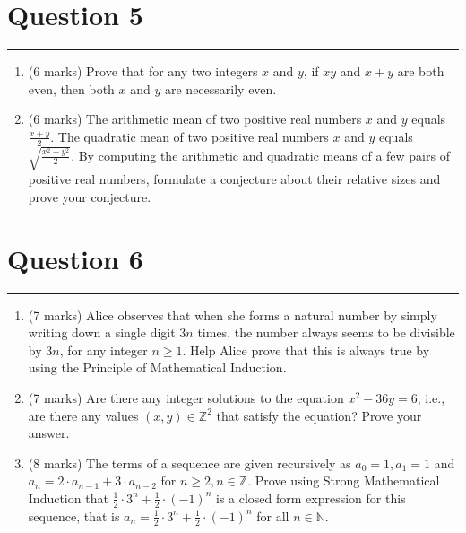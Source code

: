 \documentclass{article}
\begin{document}
\section*{Question 5}
\hrule
\vspace{0.5cm}

\begin{enumerate}[label=\alph*.]
    \item (6 marks) Prove that for any two integers \( x \) and \( y \), if \( xy \) and \( x + y \) are both even, then both \( x \) and \( y \) are necessarily even.
    \item (6 marks) The arithmetic mean of two positive real numbers \( x \) and \( y \) equals \( \frac{x + y}{2} \). The quadratic mean of two positive real numbers \( x \) and \( y \) equals \( \sqrt{\frac{x^2 + y^2}{2}} \). By computing the arithmetic and quadratic means of a few pairs of positive real numbers, formulate a conjecture about their relative sizes and prove your conjecture.
\end{enumerate}

\section*{Question 6}
\hrule
\vspace{0.5cm}

\begin{enumerate}[label=\alph*.]
    \item (7 marks) Alice observes that when she forms a natural number by simply writing down a single digit \( 3n \) times, the number always seems to be divisible by \( 3n \), for any integer \( n \geq 1 \). Help Alice prove that this is always true by using the Principle of Mathematical Induction.
    \item (7 marks) Are there any integer solutions to the equation \( x^2 - 36y = 6 \), i.e., are there any values \( (x, y) \in \mathbb{Z}^2 \) that satisfy the equation? Prove your answer.
    \item (8 marks) The terms of a sequence are given recursively as \( a_0 = 1, a_1 = 1 \) and \( a_n = 2 \cdot a_{n-1} + 3 \cdot a_{n-2} \) for \( n \geq 2, n \in \mathbb{Z} \). Prove using Strong Mathematical Induction that \( \frac12 \cdot 3^n + \frac12 \cdot (-1)^n \) is a closed form expression for this sequence, that is \( a_n = \frac12 \cdot 3^n + \frac12 \cdot (-1)^n \) for all \( n \in \mathbb{N} \).
\end{enumerate}
\end{document}

